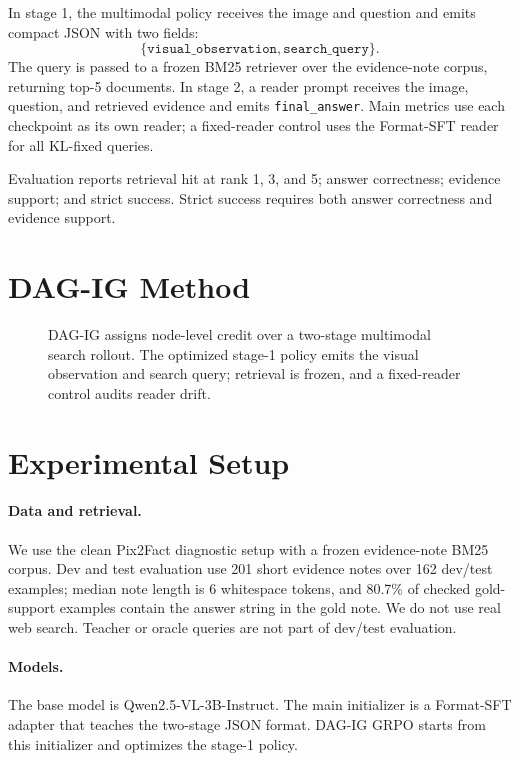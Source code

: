 In stage 1, the multimodal policy receives the image and question and emits compact JSON with two fields:
\[
\{\texttt{visual\_observation},\texttt{search\_query}\}.
\]
The query is passed to a frozen BM25 retriever over the evidence-note corpus, returning top-5 documents. In stage 2, a reader prompt receives the image, question, and retrieved evidence and emits \texttt{final\_answer}. Main metrics use each checkpoint as its own reader; a fixed-reader control uses the Format-SFT reader for all KL-fixed queries.

Evaluation reports retrieval hit at rank 1, 3, and 5; answer correctness; evidence support; and strict success. Strict success requires both answer correctness and evidence support.

\section{DAG-IG Method}

\begin{figure}[t]
\centering
\resizebox{\linewidth}{!}{}
\caption{DAG-IG assigns node-level credit over a two-stage multimodal search rollout. The optimized stage-1 policy emits the visual observation and search query; retrieval is frozen, and a fixed-reader control audits reader drift.}
\label{fig:method}
\end{figure}





\section{Experimental Setup}

\paragraph{Data and retrieval.}
We use the clean Pix2Fact diagnostic setup with a frozen evidence-note BM25 corpus. Dev and test evaluation use 201 short evidence notes over 162 dev/test examples; median note length is 6 whitespace tokens, and 80.7\% of checked gold-support examples contain the answer string in the gold note. We do not use real web search. Teacher or oracle queries are not part of dev/test evaluation.

\paragraph{Models.}
The base model is Qwen2.5-VL-3B-Instruct. The main initializer is a Format-SFT adapter that teaches the two-stage JSON format. DAG-IG GRPO starts from this initializer and optimizes the stage-1 policy.

